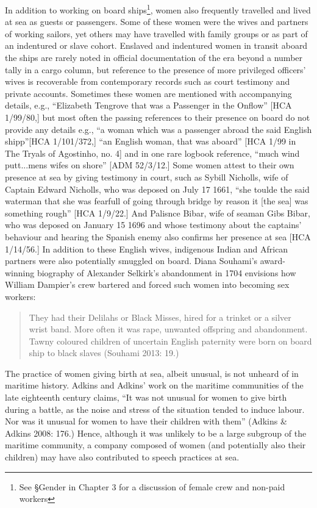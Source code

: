 \begin{styleStandard}
In addition to working on board ships\footnote{ See §Gender in Chapter 3 for a discussion of female crew and non-paid workers}, women also frequently travelled and lived at sea as guests or passengers. Some of these women were the wives and partners of working sailors, yet others may have travelled with family groups or as part of an indentured or slave cohort. Enslaved and indentured women in transit aboard the ships are rarely noted in official documentation of the era beyond a number tally in a cargo column, but reference to the presence of more privileged officers’ wives is recoverable from contemporary records such as court testimony and private accounts. Sometimes these women are mentioned with accompanying details, e.g., “Elizabeth Tengrove that was a Passenger in the Onflow” [HCA 1/99/80,] but most often the passing references to their presence on board do not provide any details e.g., “a woman which was a passenger abroad the said English shipp”[HCA 1/101/372,] “an English woman, that was aboard” [HCA 1/99 in The Tryals of Agostinho, no. 4] and in one rare logbook reference, “much wind putt...mens wifes on shore” [ADM 52/3/12.] Some women attest to their own presence at sea by giving testimony in court, such as Sybill Nicholls, wife of Captain Edward Nicholls, who was deposed on July 17 1661, “she toulde the said waterman that she was fearfull of going through bridge by reason it [the sea] was something rough” [HCA 1/9/22.] And Palisnce Bibar, wife of seaman Gibs Bibar, who was deposed on January 15 1696 and whose testimony about the captain{\textquotesingle}s’ behaviour and hearing the Spanish enemy also confirms her presence at sea [HCA 1/14/56.] In addition to these English wives, indigenous Indian and African partners were also potentially smuggled on board. Diana Souhami’s award-winning biography of Alexander Selkirk’s abandonment in 1704 envisions how William Dampier’s crew bartered and forced such women into becoming sex workers:
\end{styleStandard}


\begin{quotation}
They had their Delilahs or Black Misses, hired for a trinket or a silver wrist band. More often it was rape, unwanted offspring and abandonment. Tawny coloured children of uncertain English paternity were born on board ship to black slaves (Souhami 2013: 19.)

\end{quotation}
\begin{styleStandard}
The practice of women giving birth at sea, albeit unusual, is not unheard of in maritime history. Adkins and Adkins’ work on the maritime communities of the late eighteenth century claims, “It was not unusual for women to give birth during a battle, as the noise and stress of the situation tended to induce labour. Nor was it unusual for women to have their children with them” (Adkins \& Adkins 2008: 176.) Hence, although it was unlikely to be a large subgroup of the maritime community, a company composed of women (and potentially also their children) may have also contributed to speech practices at sea. 
\end{styleStandard}


